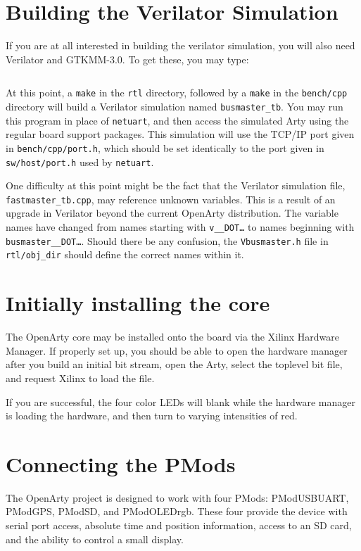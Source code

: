 \documentclass{gqtekspec}
\begin{document}
\section{Building the Verilator Simulation}
If you are at all interested in building the verilator simulation, you will 
also need Verilator and GTKMM-3.0.  To get these, you may type:
\begin{lstlisting}[language=bash]
% sudo apt-get install verilator libgtkmm-3.0-dev
\end{lstlisting}
At this point, a {\tt make} in the {\tt rtl} directory, followed by a
{\tt make} in the {\tt bench/cpp} directory will build a Verilator simulation
named {\tt busmaster\_tb}.  You may run this program in place of {\tt netuart},
and then access the simulated Arty using the regular board support packages.
This simulation will use the TCP/IP port given in {\tt bench/cpp/port.h}, which
should be set identically to the port given in {\tt sw/host/port.h} used by
{\tt netuart}.

One difficulty at this point might be the fact that the Verilator simulation
file, {\tt fastmaster\_tb.cpp}, may reference unknown variables.  This is a
result of an upgrade in Verilator beyond the current OpenArty distribution.
The variable names have changed from names starting with {\tt v\_\_DOT\ldots}
to names beginning with {\tt busmaster\_\_DOT\ldots}.  Should there be any
confusion, the {\tt Vbusmaster.h} file in {\tt rtl/obj\_dir} should define
the correct names within it.


\section{Initially installing the core}
The OpenArty core may be installed onto the board via the Xilinx Hardware
Manager.  If properly set up, you should be able to open the hardware 
manager after you build an initial bit stream, open the Arty, select the
toplevel bit file, and request Xilinx to load the file.

If you are successful, the four color LEDs will blank while the hardware
manager is loading the hardware, and then turn to varying intensities of red.

\section{Connecting the PMods}
The OpenArty project is designed to work with four PMods: PModUSBUART,
PModGPS, PModSD, and PModOLEDrgb.  These four provide the device with
serial port access, absolute time and position information, access to an
SD card, and the ability to control a small display. 
\end{document}
